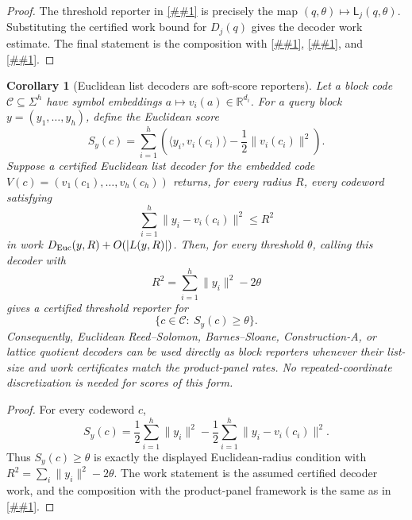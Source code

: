 \documentclass[10pt]{article}
\newcommand{\cref}[1]{\ref{##1}}
\newtheorem{corollary}[theorem]{Corollary}
\theoremstyle{definition}
\newcommand{\ip}[2]{\langle #1,#2\rangle}
\begin{document}
\begin{proof}
   The threshold reporter in \cref{lem:additive-product-panel-decoder} is
   precisely the map \((q,\theta)\mapsto\mathsf L_j(q,\theta)\).  Substituting
   the certified work bound for \(D_j(q)\) gives the decoder work estimate.
   The final statement is the composition with
   \cref{lem:additive-product-panel-decoder},
   \cref{prop:product-panel-spectrum-compiler}, and
   \cref{cor:product-panel-rate-bookkeeping}.
\end{proof}

\begin{corollary}[Euclidean list decoders are soft-score reporters]
   \label{cor:euclidean-list-decoder-reporter}
   Let a block code \(\mathcal C\subseteq\Sigma^h\) have symbol embeddings
   \(a\mapsto v_i(a)\in\mathbb R^{d_i}\).  For a query block
   \(y=(y_1,\ldots,y_h)\), define the Euclidean score
   \[
      S_y(c)
      =
      \sum_{i=1}^h
      \left(\ip{y_i}{v_i(c_i)}-\frac12\|v_i(c_i)\|^2\right).
   \]
   Suppose a certified Euclidean list decoder for the embedded code
   \(V(c)=(v_1(c_1),\ldots,v_h(c_h))\) returns, for every radius \(R\), every
   codeword satisfying
   \[
      \sum_{i=1}^h\|y_i-v_i(c_i)\|^2\le R^2
   \]
   in work \(D_{\rm Euc}(y,R)+O(|L(y,R)|)\).  Then, for every threshold
   \(\theta\), calling this decoder with
   \[
      R^2=\sum_{i=1}^h\|y_i\|^2-2\theta
   \]
   gives a certified threshold reporter for
   \[
      \{c\in\mathcal C:\ S_y(c)\ge\theta\}.
   \]
   Consequently, Euclidean Reed--Solomon, Barnes--Sloane, Construction-A, or
   lattice quotient decoders can be used directly as block reporters whenever
   their list-size and work certificates match the product-panel rates.  No
   repeated-coordinate discretization is needed for scores of this form.
\end{corollary}

\begin{proof}
   For every codeword \(c\),
   \[
      S_y(c)
      =
      \frac12\sum_{i=1}^h\|y_i\|^2
      -
      \frac12\sum_{i=1}^h\|y_i-v_i(c_i)\|^2 .
   \]
   Thus \(S_y(c)\ge\theta\) is exactly the displayed Euclidean-radius
   condition with \(R^2=\sum_i\|y_i\|^2-2\theta\).  The work statement is the
   assumed certified decoder work, and the composition with the product-panel
   framework is the same as in \cref{lem:soft-list-recovery-reporter}.
\end{proof}
\end{document}
